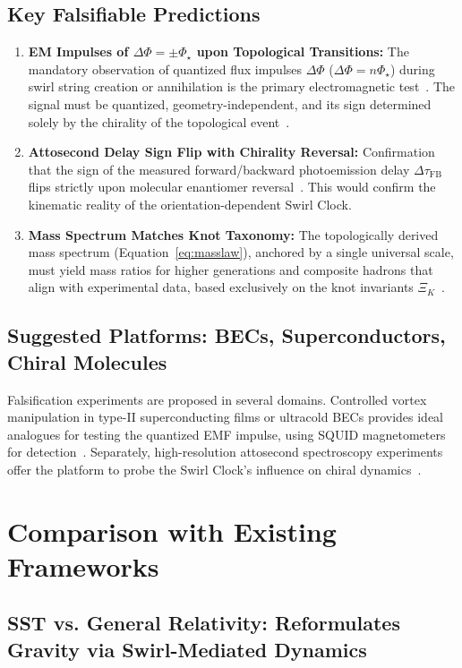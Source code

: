 \documentclass[10pt,reprint,aps,onecolumn,nofootinbib]{revtex4-2}
\begin{document}
\subsection*{Key Falsifiable Predictions}
\begin{enumerate}
    \item \textbf{EM Impulses of $\Delta\Phi = \pm \Phi_\star$ upon Topological Transitions:} The mandatory observation of quantized flux impulses $\Delta\Phi$ ($\Delta\Phi = n\Phi_\star$) during swirl string creation or annihilation is the primary electromagnetic test~\cite{2}. The signal must be quantized, geometry-independent, and its sign determined solely by the chirality of the topological event~\cite{2}.
    \item \textbf{Attosecond Delay Sign Flip with Chirality Reversal:} Confirmation that the sign of the measured forward/backward photoemission delay $\Delta\tau_\text{FB}$ flips strictly upon molecular enantiomer reversal~\cite{6}. This would confirm the kinematic reality of the orientation-dependent Swirl Clock.
    \item \textbf{Mass Spectrum Matches Knot Taxonomy:} The topologically derived mass spectrum (Equation~\ref{eq:masslaw}), anchored by a single universal scale, must yield mass ratios for higher generations and composite hadrons that align with experimental data, based exclusively on the knot invariants $\Xi_K$~\cite{4}.
\end{enumerate}

\subsection*{Suggested Platforms: BECs, Superconductors, Chiral Molecules}
Falsification experiments are proposed in several domains. Controlled vortex manipulation in type-II superconducting films or ultracold BECs provides ideal analogues for testing the quantized EMF impulse, using SQUID magnetometers for detection~\cite{2}. Separately, high-resolution attosecond spectroscopy experiments offer the platform to probe the Swirl Clock's influence on chiral dynamics~\cite{6}.

\section{Comparison with Existing Frameworks}
\label{sec:comparison}

\subsection*{SST vs. General Relativity: Reformulates Gravity via Swirl-Mediated Dynamics}
\end{document}
